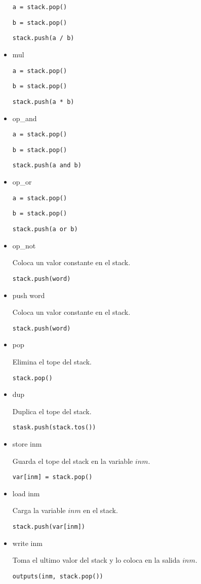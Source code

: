 \begin{itemize}
  \texttt{a = stack.pop()}

  \texttt{b = stack.pop()}

  \texttt{stack.push(a / b)}

\item mul

  \texttt{a = stack.pop()}

  \texttt{b = stack.pop()}

  \texttt{stack.push(a * b)}

\item op_and

  \texttt{a = stack.pop()}

  \texttt{b = stack.pop()}

  \texttt{stack.push(a and b)}

\item op_or

  \texttt{a = stack.pop()}

  \texttt{b = stack.pop()}

  \texttt{stack.push(a or b)}

\item op_not

  Coloca un valor constante en el stack.

  \texttt{stack.push(word)}

\item push word

  Coloca un valor constante en el stack.

  \texttt{stack.push(word)}

\item pop

  Elimina el tope del stack.

  \texttt{stack.pop()}

\item dup

  Duplica el tope del stack.

  \texttt{stask.push(stack.tos())}

\item store inm

  Guarda el tope del stack en la variable $inm$.

  \texttt{var[inm] = stack.pop()}

\item load inm

  Carga la variable $inm$ en el stack.

  \texttt{stack.push(var[inm])}

\item write inm

  Toma el ultimo valor del stack y lo coloca en la 
  salida $inm$.

  \texttt{outputs(inm, stack.pop())}

\end{itemize}

